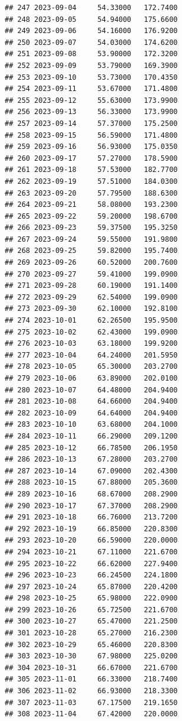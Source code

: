 \documentclass[
]{article}
\begin{document}
\begin{verbatim}
## 247 2023-09-04     54.33000   172.7400
## 248 2023-09-05     54.94000   175.6600
## 249 2023-09-06     54.16000   176.9200
## 250 2023-09-07     54.03000   174.6200
## 251 2023-09-08     53.90000   172.3200
## 252 2023-09-09     53.79000   169.3900
## 253 2023-09-10     53.73000   170.4350
## 254 2023-09-11     53.67000   171.4800
## 255 2023-09-12     55.63000   173.9900
## 256 2023-09-13     56.33000   173.9900
## 257 2023-09-14     57.37000   175.2500
## 258 2023-09-15     56.59000   171.4800
## 259 2023-09-16     56.93000   175.0350
## 260 2023-09-17     57.27000   178.5900
## 261 2023-09-18     57.53000   182.7700
## 262 2023-09-19     57.51000   184.0300
## 263 2023-09-20     57.79500   188.6300
## 264 2023-09-21     58.08000   193.2300
## 265 2023-09-22     59.20000   198.6700
## 266 2023-09-23     59.37500   195.3250
## 267 2023-09-24     59.55000   191.9800
## 268 2023-09-25     59.82000   195.7400
## 269 2023-09-26     60.52000   200.7600
## 270 2023-09-27     59.41000   199.0900
## 271 2023-09-28     60.19000   191.1400
## 272 2023-09-29     62.54000   199.0900
## 273 2023-09-30     62.10000   192.8100
## 274 2023-10-01     62.26500   195.9500
## 275 2023-10-02     62.43000   199.0900
## 276 2023-10-03     63.18000   199.9200
## 277 2023-10-04     64.24000   201.5950
## 278 2023-10-05     65.30000   203.2700
## 279 2023-10-06     63.89000   202.0100
## 280 2023-10-07     64.48000   204.9400
## 281 2023-10-08     64.66000   204.9400
## 282 2023-10-09     64.64000   204.9400
## 283 2023-10-10     63.68000   204.1000
## 284 2023-10-11     66.29000   209.1200
## 285 2023-10-12     66.78500   206.1950
## 286 2023-10-13     67.28000   203.2700
## 287 2023-10-14     67.09000   202.4300
## 288 2023-10-15     67.88000   205.3600
## 289 2023-10-16     68.67000   208.2900
## 290 2023-10-17     67.37000   208.2900
## 291 2023-10-18     66.76000   213.7200
## 292 2023-10-19     66.85000   220.8300
## 293 2023-10-20     66.59000   220.0000
## 294 2023-10-21     67.11000   221.6700
## 295 2023-10-22     66.62000   227.9400
## 296 2023-10-23     66.24500   224.1800
## 297 2023-10-24     65.87000   220.4200
## 298 2023-10-25     65.98000   222.0900
## 299 2023-10-26     65.72500   221.6700
## 300 2023-10-27     65.47000   221.2500
## 301 2023-10-28     65.27000   216.2300
## 302 2023-10-29     65.46000   220.8300
## 303 2023-10-30     67.98000   225.0200
## 304 2023-10-31     66.67000   221.6700
## 305 2023-11-01     66.33000   218.7400
## 306 2023-11-02     66.93000   218.3300
## 307 2023-11-03     67.17500   219.1650
## 308 2023-11-04     67.42000   220.0000

\end{verbatim}
\end{document}
